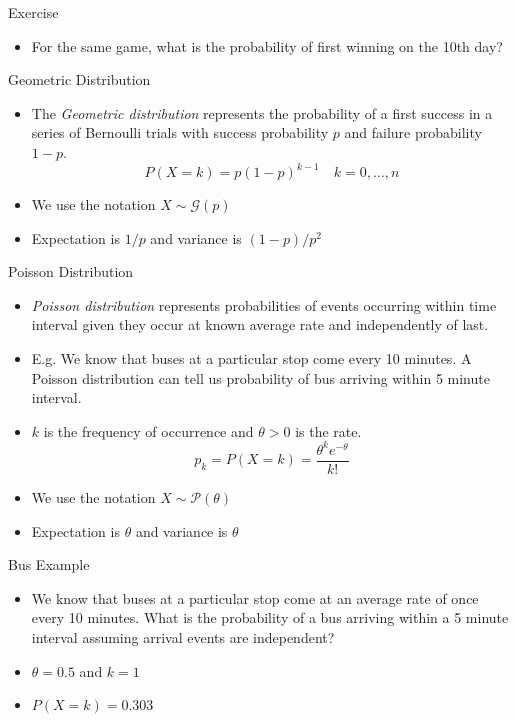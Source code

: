 \documentclass{beamer}
\begin{document}
\begin{frame}{Exercise} 
\begin{itemize} 
 \item For the same game, what is the probability of first winning on the 10th day? 
\end{itemize}
\end{frame}

\begin{frame}{Geometric Distribution} 
\begin{itemize} 
 \item The \emph{Geometric distribution} represents the probability of a first success in a series of Bernoulli trials with success probability $p$ and failure probability $1-p$.  
 \begin{displaymath} 
 P(X = k) = p (1-p)^{k-1} \quad  k = 0, \ldots, n
\end{displaymath}
\item We use the notation $X \sim \mathcal{G}(p)$
\item Expectation is $1/p$ and variance is $(1-p)/p^2$
\end{itemize}
\end{frame}

\begin{frame}{Poisson Distribution}  
\begin{itemize} 
 \item \emph{Poisson distribution} represents probabilities of events occurring within time interval given they occur at known average rate and independently of last.  
 \item E.g. We know that buses at a particular stop come every 10 minutes. A Poisson distribution can tell us probability of bus arriving within 5 minute interval. 
 \item $k$ is the frequency of occurrence and $\theta > 0$ is the rate. 
 \begin{displaymath} 
  p_k = P(X = k) = \frac{\theta^k e^{-\theta}}{k!}
 \end{displaymath}
\item We use the notation $X \sim \mathcal{P}(\theta)$
\item Expectation is $\theta$ and variance is $\theta$ 
\end{itemize}
\end{frame}

\begin{frame}{Bus Example}  
\begin{itemize} 
 \item We know that buses at a particular stop come at an average rate of once every 10 minutes. What is the probability of a bus arriving within a 5 minute interval assuming arrival events are independent?
 \item $\theta = 0.5$ and $k = 1$ 
 \item $P(X = k) = 0.303$ 
\end{itemize}
\end{frame}
\end{document}
